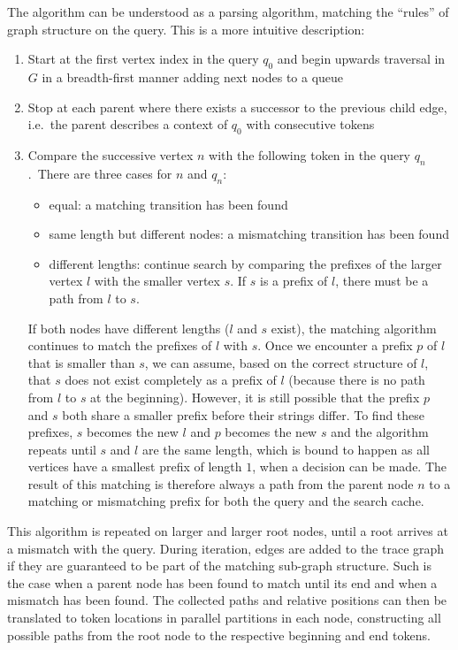 \noindent
The algorithm can be understood as a parsing algorithm, matching the ``rules'' of graph structure on the query. This is a more intuitive description:
\begin{enumerate}
    \item Start at the first vertex index in the query $q_0$ and begin upwards traversal in $G$ in a breadth-first manner adding next nodes to a queue
    \item Stop at each parent where there exists a successor to the previous child edge, i.e.\ the parent describes a context of $q_0$ with consecutive tokens
    \item Compare the successive vertex $n$ with the following token in the query $q_n$.\ There are three cases for $n$ and $q_n$:
    \begin{itemize}
        \item equal: a matching transition has been found
        \item same length but different nodes: a mismatching transition has been found
        \item different lengths: continue search by comparing the prefixes of the larger vertex $l$ with the smaller vertex $s$. If $s$ is a prefix of $l$, there must be a path from $l$ to $s$.  
    \end{itemize}
    If both nodes have different lengths ($l$ and $s$ exist), the matching algorithm continues to match the prefixes of $l$ with $s$.
    Once we encounter a prefix $p$ of $l$ that is smaller than $s$, we can assume, based on the correct structure of $l$, that $s$ does not exist completely as a prefix of $l$ (because there is no path from $l$ to $s$ at the beginning). However, it is still possible that the prefix $p$ and $s$ both share a smaller prefix before their strings differ. To find these prefixes, $s$ becomes the new $l$ and $p$ becomes the new $s$ and the algorithm repeats until $s$ and $l$ are the same length, which is bound to happen as all vertices have a smallest prefix of length $1$, when a decision can be made.
    The result of this matching is therefore always a path from the parent node $n$ to a matching or mismatching prefix for both the query and the search cache.
\end{enumerate}

\noindent
This algorithm is repeated on larger and larger root nodes, until a root arrives at a mismatch with the query. During iteration, edges are added to the trace graph if they are guaranteed to be part of the matching sub-graph structure. Such is the case when a parent node has been found to match until its end and when a mismatch has been found. The collected paths and relative positions can then be translated to token locations in parallel partitions in each node, constructing all possible paths from the root node to the respective beginning and end tokens.

